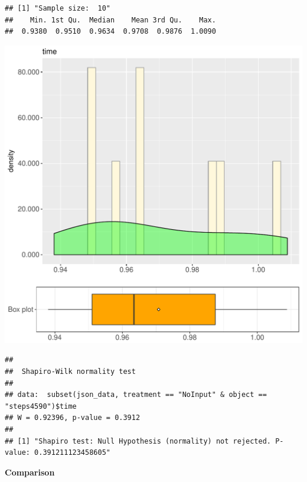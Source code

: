 \documentclass{article}\usepackage[]{graphicx}\usepackage[]{color}
\makeatletter
\def\maxwidth{ %
  \ifdim\Gin@nat@width>\linewidth
    \linewidth
  \else
    \Gin@nat@width
  \fi
}
\newenvironment{kframe}{%
 \def\at@end@of@kframe{}%
 \ifinner\ifhmode%
  \def\at@end@of@kframe{\end{minipage}}%
  \begin{minipage}{\columnwidth}%
 \fi\fi%
 \def\FrameCommand##1{\hskip\@totalleftmargin \hskip-\fboxsep
 \colorbox{shadecolor}{##1}\hskip-\fboxsep
     \hskip-\linewidth \hskip-\@totalleftmargin \hskip\columnwidth}%
 \MakeFramed {\advance\hsize-\width
   \@totalleftmargin\z@ \linewidth\hsize
   \@setminipage}}%
 {\par\unskip\endMakeFramed%
 \at@end@of@kframe}
\newenvironment{knitrout}{}{} %
\makeatother
\begin{document}
\begin{knitrout}
\color{fgcolor}\begin{kframe}
\begin{verbatim}
## [1] "Sample size:  10"
##    Min. 1st Qu.  Median    Mean 3rd Qu.    Max. 
##  0.9380  0.9510  0.9634  0.9708  0.9876  1.0090
\end{verbatim}
\end{kframe}
\includegraphics[width=\maxwidth]{figure/RH4_NoInput_steps4590-1} 
\begin{kframe}\begin{verbatim}
## 
## 	Shapiro-Wilk normality test
## 
## data:  subset(json_data, treatment == "NoInput" & object == "steps4590")$time
## W = 0.92396, p-value = 0.3912
## 
## [1] "Shapiro test: Null Hypothesis (normality) not rejected. P-value: 0.391211123458605"
\end{verbatim}
\end{kframe}
\end{knitrout}
  
 \textbf{Comparison}
  
\end{document}
